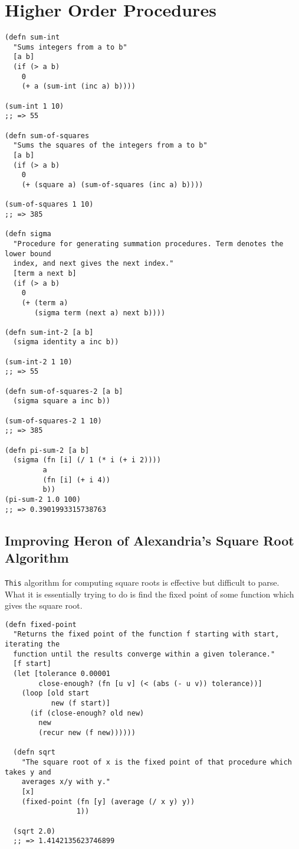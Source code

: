\documentclass[11pt]{article}
\begin{document}
\section{Higher Order Procedures}
\label{sec-3}
\begin{verbatim}
(defn sum-int
  "Sums integers from a to b"
  [a b]
  (if (> a b)
    0
    (+ a (sum-int (inc a) b))))

(sum-int 1 10)
;; => 55

(defn sum-of-squares
  "Sums the squares of the integers from a to b"
  [a b]
  (if (> a b)
    0
    (+ (square a) (sum-of-squares (inc a) b))))

(sum-of-squares 1 10)
;; => 385

(defn sigma
  "Procedure for generating summation procedures. Term denotes the lower bound
  index, and next gives the next index."
  [term a next b]
  (if (> a b)
    0
    (+ (term a)
       (sigma term (next a) next b))))

(defn sum-int-2 [a b]
  (sigma identity a inc b))

(sum-int-2 1 10)
;; => 55

(defn sum-of-squares-2 [a b]
  (sigma square a inc b))

(sum-of-squares-2 1 10)
;; => 385

(defn pi-sum-2 [a b]
  (sigma (fn [i] (/ 1 (* i (+ i 2))))
         a
         (fn [i] (+ i 4))
         b))
(pi-sum-2 1.0 100)
;; => 0.3901993315738763
\end{verbatim}
\subsection{Improving Heron of Alexandria's Square Root Algorithm}
\label{sec-3-1}
\texttt{This} algorithm for computing square roots is effective but difficult to parse. What it is essentially trying to do is find the fixed point of some function which gives the square root.

\begin{verbatim}
(defn fixed-point
  "Returns the fixed point of the function f starting with start, iterating the
  function until the results converge within a given tolerance."
  [f start]
  (let [tolerance 0.00001
        close-enough? (fn [u v] (< (abs (- u v)) tolerance))]
    (loop [old start
           new (f start)]
      (if (close-enough? old new)
        new
        (recur new (f new))))))

  (defn sqrt
    "The square root of x is the fixed point of that procedure which takes y and
    averages x/y with y."
    [x]
    (fixed-point (fn [y] (average (/ x y) y))
                 1))

  (sqrt 2.0)
  ;; => 1.4142135623746899
\end{verbatim}
\end{document}
